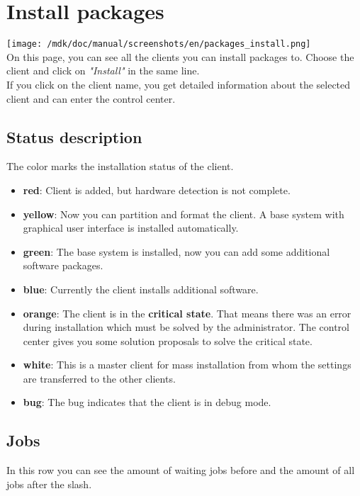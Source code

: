 \section{Install packages}
\texttt{[image: /mdk/doc/manual/screenshots/en/packages\_install.png]} \\
On this page, you can see all the clients you can install packages to. Choose the client and click on \textit{"Install"} in the same line.\\
If you click on the client name, you get detailed information about the selected client and can enter the control center.\\
\subsection{Status description}
The color marks the installation status of the client.\\
\begin{itemize}
\item \textbf{red}: Client is added, but hardware detection is not complete.\\
\item \textbf{yellow}: Now you can partition and format the client. A base system with graphical user interface is installed automatically.\\
\item \textbf{green}: The base system is installed, now you can add some additional software packages.\\
\item \textbf{blue}: Currently the client installs additional software.\\
\item \textbf{orange}: The client is in the \textbf{critical state}. That means there was an error during installation which must be solved by the administrator. The control center gives you some solution proposals to solve the critical state.\\
\item \textbf{white}: This is a master client for mass installation from whom the settings are transferred to the other clients.\\
\item \textbf{bug}: The bug indicates that the client is in debug mode.\\
\end{itemize}
\subsection{Jobs}
In this row you can see the amount of waiting jobs before and the amount of all jobs after the slash.\\
